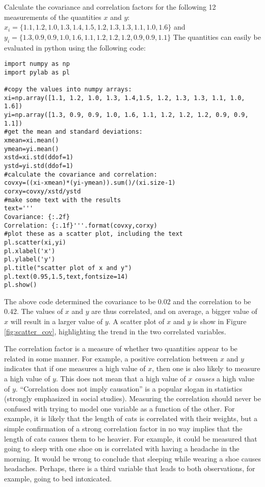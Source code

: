 \begin{example}{}{Calculate the covariance and correlation factors for the following 12 measurements of the quantities $x$ and $y$: $x_i=\{1.1, 1.2, 1.0, 1.3, 1.4,1.5, 1.2, 1.3, 1.3, 1.1, 1.0, 1.6\}$ and $y_i=\{1.3, 0.9, 0.9, 1.0, 1.6, 1.1, 1.2, 1.2, 1.2, 0.9, 0.9, 1.1\}$}{}
\label{ex:covariance}
The quantities can easily be evaluated in python using the following code:
\begin{lstlisting}[frame=single] 
import numpy as np
import pylab as pl

#copy the values into numpy arrays:
xi=np.array([1.1, 1.2, 1.0, 1.3, 1.4,1.5, 1.2, 1.3, 1.3, 1.1, 1.0, 1.6])
yi=np.array([1.3, 0.9, 0.9, 1.0, 1.6, 1.1, 1.2, 1.2, 1.2, 0.9, 0.9, 1.1])
#get the mean and standard deviations:
xmean=xi.mean()
ymean=yi.mean()
xstd=xi.std(ddof=1)
ystd=yi.std(ddof=1)
#calculate the covariance and correlation:
covxy=((xi-xmean)*(yi-ymean)).sum()/(xi.size-1)
corxy=covxy/xstd/ystd
#make some text with the results
text='''
Covariance: {:.2f}
Correlation: {:.1f}'''.format(covxy,corxy)
#plot these as a scatter plot, including the text
pl.scatter(xi,yi)
pl.xlabel('x')
pl.ylabel('y')
pl.title("scatter plot of x and y")
pl.text(0.95,1.5,text,fontsize=14)
pl.show()
\end{lstlisting}
The above code determined the covariance to be 0.02 and the correlation to be 0.42. The values of $x$ and $y$ are thus correlated, and on average, a bigger value of $x$ will result in a larger value of $y$. A scatter plot of $x$ and $y$ is show in Figure \ref{fig:scatter_cov}, highlighting the trend in the two correlated variables.


\end{example}

The correlation factor is a measure of whether two quantities appear to be related in some manner. For example, a positive correlation between $x$ and $y$ indicates that if one measures a high value of $x$, then one is also likely to measure a high value of $y$. This does not mean that a high value of $x$ \textit{causes} a high value of $y$. ``Correlation does not imply causation'' is a popular slogan in statistics (strongly emphasized in social studies). Measuring the correlation should never be confused with trying to model one variable as a function of the other. For example, it is likely that the length of cats is correlated with their weights, but a simple confirmation of a strong correlation factor in no way implies that the length of cats causes them to be heavier. For example, it could be measured that going to sleep with one shoe on is correlated with having a headache in the morning. It would be wrong to conclude that sleeping while wearing a shoe causes headaches. Perhaps, there is a third variable that leads to both observations, for example, going to bed intoxicated. 

